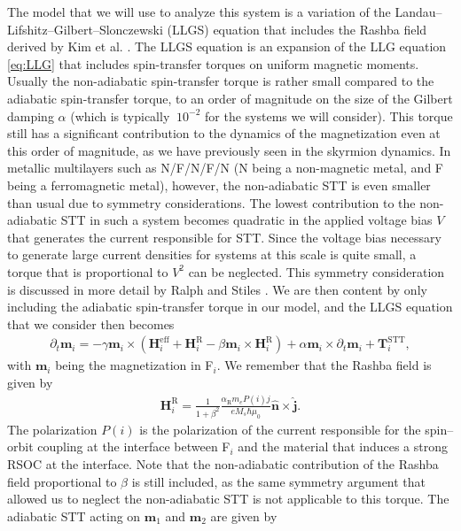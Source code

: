 The model that we will use to analyze this system is a variation of the Landau--Lifshitz--Gilbert--Slonczewski (LLGS) equation that includes the Rashba field derived by Kim et al. \cite{Kim2012}. The LLGS equation is an expansion of the LLG equation \eqref{eq:LLG} that includes spin-transfer torques on uniform magnetic moments. Usually the non-adiabatic spin-transfer torque is rather small compared to the adiabatic spin-transfer torque, to an order of magnitude on the size of the Gilbert damping $\alpha$ (which is typically $~10^{-2}$ for the systems we will consider). This torque still has a significant contribution to the dynamics of the magnetization even at this order of magnitude, as we have previously seen in the skyrmion dynamics. In metallic multilayers such as N/F/N/F/N (N being a non-magnetic metal, and F being a ferromagnetic metal), however, the non-adiabatic STT is even smaller than usual due to symmetry considerations. The lowest contribution to the non-adiabatic STT in such a system becomes quadratic in the applied voltage bias $V$ that generates the current responsible for STT. Since the voltage bias necessary to generate large current densities for systems at this scale is quite small, a torque that is proportional to $V^2$ can be neglected. This symmetry consideration is discussed in more detail by Ralph and Stiles \cite{Ralph2008}. We are then content by only including the adiabatic spin-transfer torque in our model, and the LLGS equation that we consider then becomes
\begin{align}
    \label{eq:LLGS}
    \partial_t \mathbold{m}_i = -\gamma \mathbold{m}_i\times\left(\mathbold{H}^{\text{eff}}_i+\mathbold{H}^{\text{R}}_i - \beta\mathbold{m}_i\times\mathbold{H}^{\text{R}}_i\right) + \alpha\mathbold{m}_i \times\partial_t\mathbold{m}_i + \mathbold{T}^{\text{STT}}_i,
\end{align}
with $\mathbold{m}_i$ being the magnetization in F$_i$. We remember that the Rashba field is given by
\begin{align}
    \mathbold{H}^{\text{R}}_i = \frac{1}{1+\beta^2}\frac{\alpha_{\text{R}}m_e P(i) j}{e M_s \hbar \mu_0} \mathbold{\hat{n}}\times\mathbold{\hat{j}}.
\end{align}
The polarization $P(i)$ is the polarization of the current responsible for the spin--orbit coupling at the interface between F$_i$ and the material that induces a strong RSOC at the interface. Note that the non-adiabatic contribution of the Rashba field proportional to $\beta$ is still included, as the same symmetry argument that allowed us to neglect the non-adiabatic STT is not applicable to this torque. The adiabatic STT acting on $\mathbold{m}_1$ and $\mathbold{m}_2$ are given by
